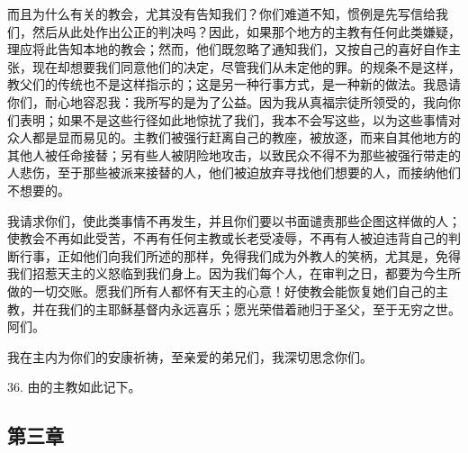 而且为什么有关的教会，尤其没有告知我们？你们难道不知，惯例是先写信给我们，然后从此处作出公正的判决吗？因此，如果那个地方的主教有任何此类嫌疑，理应将此告知本地的教会；然而，他们既忽略了通知我们，又按自己的喜好自作主张，现在却想要我们同意他们的决定，尽管我们从未定他的罪。的规条不是这样，教父们的传统也不是这样指示的；这是另一种行事方式，是一种新的做法。我恳请你们，耐心地容忍我：我所写的是为了公益。因为我从真福宗徒所领受的，我向你们表明；如果不是这些行径如此地惊扰了我们，我本不会写这些，以为这些事情对众人都是显而易见的。主教们被强行赶离自己的教座，被放逐，而来自其他地方的其他人被任命接替；另有些人被阴险地攻击，以致民众不得不为那些被强行带走的人悲伤，至于那些被派来接替的人，他们被迫放弃寻找他们想要的人，而接纳他们不想要的。\par

我请求你们，使此类事情不再发生，并且你们要以书面谴责那些企图这样做的人；使教会不再如此受苦，不再有任何主教或长老受凌辱，不再有人被迫违背自己的判断行事，正如他们向我们所述的那样，免得我们成为外教人的笑柄，尤其是，免得我们招惹天主的义怒临到我们身上。因为我们每个人，在审判之日，都要为今生所做的一切交账。愿我们所有人都怀有天主的心意！好使教会能恢复她们自己的主教，并在我们的主耶稣基督内永远喜乐；愿光荣借着祂归于圣父，至于无穷之世。阿们。\par

我在主内为你们的安康祈祷，至亲爱的弟兄们，我深切思念你们。\par

36. 由的主教如此记下。\par


\subsection{第三章 }

